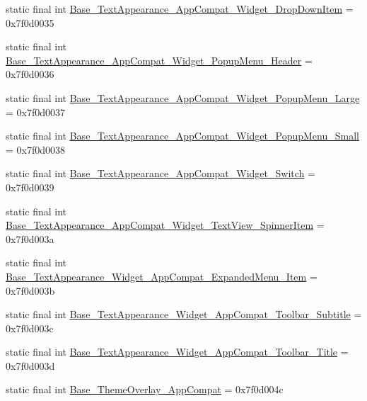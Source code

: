 \begin{DoxyCompactItemize}
\item 
static final int \mbox{\hyperlink{classcom_1_1synnapps_1_1carouselview_1_1_r_1_1style_a3fbfdc0c5ca875da9b74dcc8b4bdd4ad}{Base\+\_\+\+Text\+Appearance\+\_\+\+App\+Compat\+\_\+\+Widget\+\_\+\+Drop\+Down\+Item}} = 0x7f0d0035
\item 
static final int \mbox{\hyperlink{classcom_1_1synnapps_1_1carouselview_1_1_r_1_1style_a13c887eaaa957a5d6da662cb4fe21ff8}{Base\+\_\+\+Text\+Appearance\+\_\+\+App\+Compat\+\_\+\+Widget\+\_\+\+Popup\+Menu\+\_\+\+Header}} = 0x7f0d0036
\item 
static final int \mbox{\hyperlink{classcom_1_1synnapps_1_1carouselview_1_1_r_1_1style_a83541b7d0f9e207696d88e19d4f10344}{Base\+\_\+\+Text\+Appearance\+\_\+\+App\+Compat\+\_\+\+Widget\+\_\+\+Popup\+Menu\+\_\+\+Large}} = 0x7f0d0037
\item 
static final int \mbox{\hyperlink{classcom_1_1synnapps_1_1carouselview_1_1_r_1_1style_a3d3c3d62cc608c451402757706ff0ebe}{Base\+\_\+\+Text\+Appearance\+\_\+\+App\+Compat\+\_\+\+Widget\+\_\+\+Popup\+Menu\+\_\+\+Small}} = 0x7f0d0038
\item 
static final int \mbox{\hyperlink{classcom_1_1synnapps_1_1carouselview_1_1_r_1_1style_a08a5a17a8953ef5ea07c8b57a76282f3}{Base\+\_\+\+Text\+Appearance\+\_\+\+App\+Compat\+\_\+\+Widget\+\_\+\+Switch}} = 0x7f0d0039
\item 
static final int \mbox{\hyperlink{classcom_1_1synnapps_1_1carouselview_1_1_r_1_1style_a8e72b5520633306b7db5e2a4a62fa76e}{Base\+\_\+\+Text\+Appearance\+\_\+\+App\+Compat\+\_\+\+Widget\+\_\+\+Text\+View\+\_\+\+Spinner\+Item}} = 0x7f0d003a
\item 
static final int \mbox{\hyperlink{classcom_1_1synnapps_1_1carouselview_1_1_r_1_1style_a229127dd5f5171b21b309fc906d8fcd2}{Base\+\_\+\+Text\+Appearance\+\_\+\+Widget\+\_\+\+App\+Compat\+\_\+\+Expanded\+Menu\+\_\+\+Item}} = 0x7f0d003b
\item 
static final int \mbox{\hyperlink{classcom_1_1synnapps_1_1carouselview_1_1_r_1_1style_aa0cde8686400cfe2e7c64c61b7cf6924}{Base\+\_\+\+Text\+Appearance\+\_\+\+Widget\+\_\+\+App\+Compat\+\_\+\+Toolbar\+\_\+\+Subtitle}} = 0x7f0d003c
\item 
static final int \mbox{\hyperlink{classcom_1_1synnapps_1_1carouselview_1_1_r_1_1style_aaf39f2969462826d2c5c053ec37dd43f}{Base\+\_\+\+Text\+Appearance\+\_\+\+Widget\+\_\+\+App\+Compat\+\_\+\+Toolbar\+\_\+\+Title}} = 0x7f0d003d
\item 
static final int \mbox{\hyperlink{classcom_1_1synnapps_1_1carouselview_1_1_r_1_1style_a264438b3048eb147a9e88798740b2b17}{Base\+\_\+\+Theme\+Overlay\+\_\+\+App\+Compat}} = 0x7f0d004c

\end{DoxyCompactItemize}
